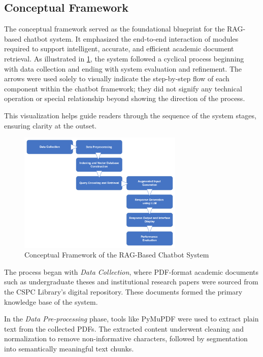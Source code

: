 \begin{refsection}
\section{Conceptual Framework}

The conceptual framework served as the foundational blueprint for the RAG-based chatbot system. It emphasized the end-to-end interaction of modules required to support intelligent, accurate, and efficient academic document retrieval. As illustrated in \ref{fig:conceptual_framework}, the system followed a cyclical process beginning with data collection and ending with system evaluation and refinement.
The arrows were used solely to visually indicate the step-by-step flow of each component within the chatbot framework; they did not signify any technical operation or special relationship beyond showing the direction of the process. 

This visualization helps guide readers through the sequence of the system stages, ensuring clarity at the outset.

\begin{figure}[H]
    \centering
    \includegraphics[width=0.7\textwidth]{figures/framework.png}
    \caption{Conceptual Framework of the RAG-Based Chatbot System}
    \label{fig:conceptual_framework}
\end{figure}

The process began with \textit{Data Collection}, where PDF-format academic documents such as undergraduate theses and institutional research papers were sourced from the CSPC Library’s digital repository. These documents formed the primary knowledge base of the system.

In the \textit{Data Pre-processing} phase, tools like PyMuPDF were used to extract plain text from the collected PDFs. The extracted content underwent cleaning and normalization to remove non-informative characters, followed by segmentation into semantically meaningful text chunks.


\end{refsection}
